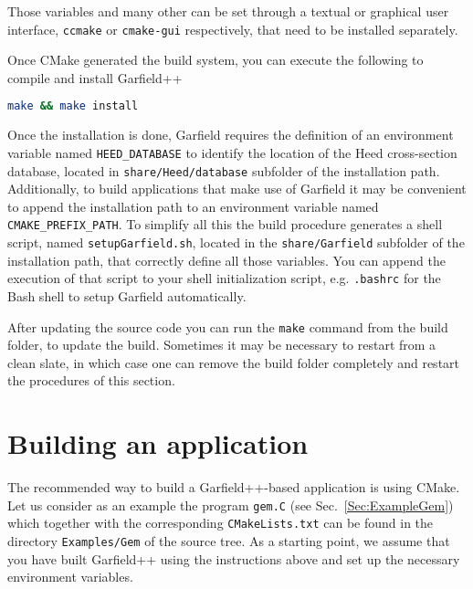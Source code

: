 Those variables and many other can be set through a textual or graphical user interface, \texttt{ccmake} or \texttt{cmake-gui} respectively, that need to be installed separately.

Once CMake generated the build system, you can execute the following to compile and install Garfield++

\begin{lstlisting}[language=bash]
make && make install
\end{lstlisting}

Once the installation is done, Garfield requires the definition of an environment variable named \texttt{HEED\_DATABASE} to identify the location of the Heed cross-section database, located in \texttt{share/Heed/database} subfolder of the installation path. Additionally, to build applications that make use of Garfield it may be convenient to append the installation path to an environment variable named \texttt{CMAKE\_PREFIX\_PATH}. To simplify all this the build procedure generates a shell script, named \texttt{setupGarfield.sh}, located in the \texttt{share/Garfield} subfolder of the installation path, that correctly define all those variables. You can append the execution of that script to your shell initialization script, e.g. \texttt{.bashrc} for the Bash shell to setup Garfield automatically.

After updating the source code you can run the \texttt{make} command from the build folder, to update the build. Sometimes it may be necessary to restart from a clean slate, in which case one can remove the build folder completely and restart the procedures of this section.

\section{Building an application}
The recommended way to build a Garfield++-based application is 
using CMake. Let us consider as an example the program \texttt{gem.C} 
(see Sec.~\ref{Sec:ExampleGem}) 
which together with the corresponding \texttt{CMakeLists.txt} can be 
found in the directory \texttt{Examples/Gem} of the source tree. 
As a starting point, we assume that you have built Garfield++ using the 
instructions above and set up the necessary environment variables. 

